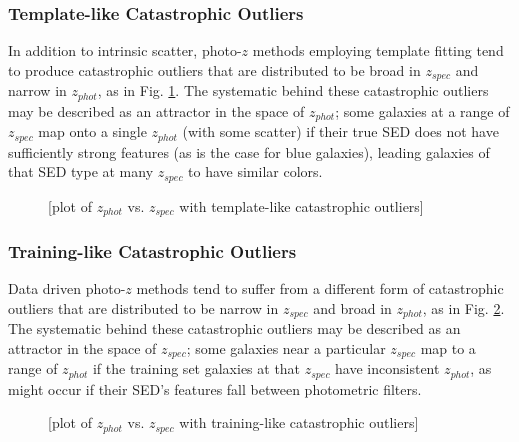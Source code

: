 \documentclass[iop]{emulateapj}
\begin{document}
\subsubsection{Template-like Catastrophic Outliers}
\label{sec:tempcatout}

In addition to intrinsic scatter, photo-$z$ methods employing template fitting tend to produce catastrophic outliers that are distributed to be broad in $z_{spec}$ and narrow in $z_{phot}$, as in Fig. \ref{fig:tempcatout}.  The systematic behind these catastrophic outliers may be described as an attractor in the space of $z_{phot}$; some galaxies at a range of $z_{spec}$ map onto a single $z_{phot}$ (with some scatter) if their true SED does not have sufficiently strong features (as is the case for blue galaxies), leading galaxies of that SED type at many $z_{spec}$ to have similar colors.

\begin{figure}
	\begin{center}
		\caption{[plot of $z_{phot}$ vs. $z_{spec}$ with template-like catastrophic outliers]}
		\label{fig:tempcatout}
	\end{center}
\end{figure}

\subsubsection{Training-like Catastrophic Outliers}
\label{sec:traincatout}

Data driven photo-$z$ methods tend to suffer from a different form of catastrophic outliers that are distributed to be narrow in $z_{spec}$ and broad in $z_{phot}$, as in Fig. \ref{fig:traincatout}.  The systematic behind these catastrophic outliers may be described as an attractor in the space of $z_{spec}$; some galaxies near a particular $z_{spec}$ map to a range of $z_{phot}$ if the training set galaxies at that $z_{spec}$ have inconsistent $z_{phot}$, as might occur if their SED's features fall between photometric filters.

\begin{figure}
	\begin{center}
		\caption{[plot of $z_{phot}$ vs. $z_{spec}$ with training-like catastrophic outliers]}
		\label{fig:traincatout}
	\end{center}
\end{figure}
\end{document}

